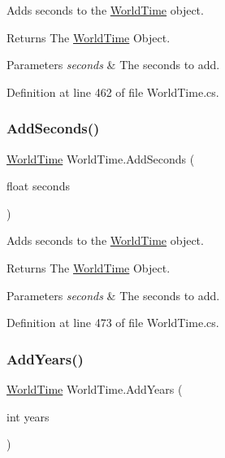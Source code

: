 Adds seconds to the \hyperlink{struct_world_time}{World\+Time} object. 

\begin{DoxyReturn}{Returns}
The \hyperlink{struct_world_time}{World\+Time} Object.
\end{DoxyReturn}

\begin{DoxyParams}{Parameters}
{\em seconds} & The seconds to add.\\
\hline
\end{DoxyParams}


Definition at line 462 of file World\+Time.\+cs.

\mbox{\label{struct_world_time_a68c14abe7986ee983c6cbc6aeaff3764}} 
\subsubsection{\texorpdfstring{Add\+Seconds()}{AddSeconds()}\hspace{0.1cm}{\footnotesize\ttfamily [2/2]}}
{\footnotesize\ttfamily \hyperlink{struct_world_time}{World\+Time} World\+Time.\+Add\+Seconds (\begin{DoxyParamCaption}\item[{float}]{seconds }\end{DoxyParamCaption})}



Adds seconds to the \hyperlink{struct_world_time}{World\+Time} object. 

\begin{DoxyReturn}{Returns}
The \hyperlink{struct_world_time}{World\+Time} Object.
\end{DoxyReturn}

\begin{DoxyParams}{Parameters}
{\em seconds} & The seconds to add.\\
\hline
\end{DoxyParams}


Definition at line 473 of file World\+Time.\+cs.

\mbox{\label{struct_world_time_a31bb7596c5c18af048706dbad01dbc66}} 
\subsubsection{\texorpdfstring{Add\+Years()}{AddYears()}}
{\footnotesize\ttfamily \hyperlink{struct_world_time}{World\+Time} World\+Time.\+Add\+Years (\begin{DoxyParamCaption}\item[{int}]{years }\end{DoxyParamCaption})}



